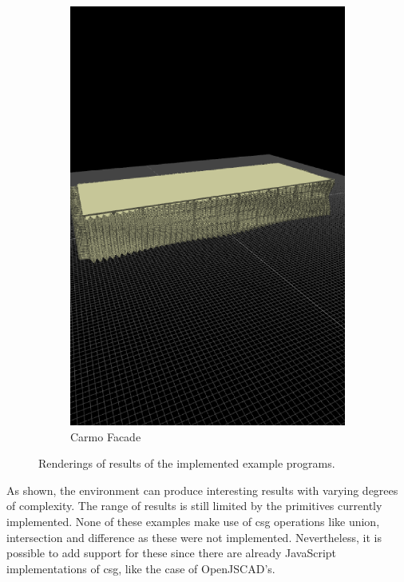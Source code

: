 \begin{figure}
\begin{subfigure}[b]{0.25\linewidth}
    \includegraphics[width=1.0\linewidth]{./images/all_examples/edificio_carmo_crop}
    \caption{Carmo Facade}
    \label{fig:ex:carmo:facade}
  \end{subfigure}

  \caption{Renderings of results of the implemented example programs.}
  \label{fig:all:examples}
\end{figure}

As shown, the environment can produce interesting results with varying degrees of complexity.
The range of results is still limited by the primitives currently implemented.
None of these examples make use of \gls{csg} operations like union, intersection and difference as these were not implemented.
Nevertheless, it is possible to add support for these since there are already JavaScript implementations of \gls{csg}, like the case of OpenJSCAD's.


